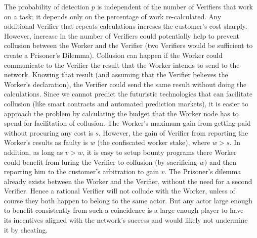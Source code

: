 \documentclass{article}
\begin{document}
The probability of detection $p$ is independent of the number of Verifiers
that work on a task; it depends only on the percentage of work
re-calculated. Any additional Verifier that repeats calculations increses
the customer's cost sharply. However, increase in the number of Verifiers
could potentially help to prevent collusion between the Worker and the
Verifier (two Verifiers would be sufficient to create a Prisoner's Dilemma).
Collusion can happen if the Worker could communicate to the Verifier the
result that the Worker intends to send to the network. Knowing that result
(and assuming that the Verifier believes the Worker's declaration), the
Verifier could send the same result without doing the calculations. Since we
cannot predict the futuristic technologies that can facilitate collusion
(like smart contracts and automated prediction markets), it is easier to
approach the problem by calculating the budget that the Worker node has to
spend for facilitation of collusion. The Worker's maximum gain from getting
paid without procuring any cost is $s$\thinspace . However, the gain of
Verifier from reporting the Worker's results as faulty is $w$ (the
confiscated worker stake), where $w>s$. In addition, as long as $v>w$, it is
easy to setup bounty programs there Worker could benefit from luring the
Verifier to collusion (by sacrificing $w)$ and then reporting him to the
customer's arbitration to gain $v$. The Prisoner's dilemma already exists
between the Worker and the Verifier, without the need for a second Verifier.
Hence a rational Verifier will not collude with the Worker, unless of course
they both happen to belong to the same actor. But any actor large enough to
benefit consistently from such a coincidence is a large enough player to
have its incentives aligned with the network's success and would likely not
undermine it by cheating.
\end{document}
